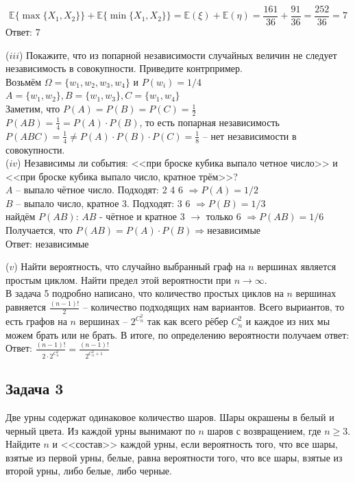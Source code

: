 \documentclass[a4paper,12pt]{article} %
\begin{document}
$$
\mathbb{E}\{\max\{X_1,X_2\}\} + \mathbb{E}\{\min\{X_1,X_2\}\} = \mathbb{E}(\xi) + \mathbb{E}(\eta) = \frac{161}{36} + \frac{91}{36} = \frac{252}{36} = 7
$$
Ответ: 7

($iii$) Покажите, что из попарной независимости случайных величин не следует независимость в совокупности. Приведите контрпример.\\
Возьмём $ \Omega = \{ w_1, w_2, w_3, w_4\} $ и $ P(w_i) = 1/4 $\\
$ A = \{ w_1, w_2\}, B = \{ w_1, w_3\}, C = \{ w_1, w_4\} $\\

Заметим, что $ P(A) = P(B) = P(C) = \frac{1}{2} $\\
$ P(AB) = \frac{1}{4} = P(A) \cdot P(B)$, то есть попарная независимость\\
$ P(ABC) = \frac{1}{4} \neq P(A) \cdot P(B) \cdot P(C) = \frac{1}{8} $ -- нет независимости в совокупности.\\

($iv$) Независимы ли события: <<при броске кубика выпало четное число>> и <<при броске кубика выпало число, кратное трём>>?\\
$ A $ -- выпало чётное число. Подходят: 2 4 6 $ \Rightarrow P(A) = 1/2 $\\
$ B $ -- выпало число, кратное 3. Подходят: 3 6 $ \Rightarrow P(B) = 1/3 $\\
найдём $ P(AB) $: $ AB $ - чётное и кратное 3 $ \rightarrow $ только 6 $ \Rightarrow P(AB) = 1/6 $\\
Получается, что $ P(AB) = P(A) \cdot P(B) \Rightarrow \text{независимые}$\\

Ответ: независимые

($v$) Найти вероятность, что случайно выбранный граф на $n$ вершинах является простым циклом. Найти предел этой вероятности при $n\rightarrow \infty$. \\

В задача 5 подробно написано, что количество простых циклов на $ n $ вершинах равняется $ \frac{(n-1)!}{2} $ -- количество подходящих нам вариантов. Всего выриантов, то есть графов на $ n $ вершинах -- $ 2^{C_{n}^{2}} $ так как всего рёбер $ C_{n}^{2} $ и каждое из них мы можем брать или не брать. В итоге, по определению вероятности получаем ответ:\\

Ответ: $ \frac{(n-1)!}{2 \cdot 2^{C_{n}^{2}} } = \frac{(n-1)!}{2^{C_{n}^{2}+1} }$


\subsection*{Задача 3}
Две урны содержат одинаковое количество шаров. Шары окрашены в белый и черный цвета. Из каждой урны вынимают по $n$ шаров с возвращением, где $n \geq 3$. Найдите $n$ и <<состав>> каждой урны, если вероятность того, что все шары, взятые из первой урны, белые, равна вероятности того, что все шары, взятые из второй урны, либо белые, либо черные.\\
\end{document}
